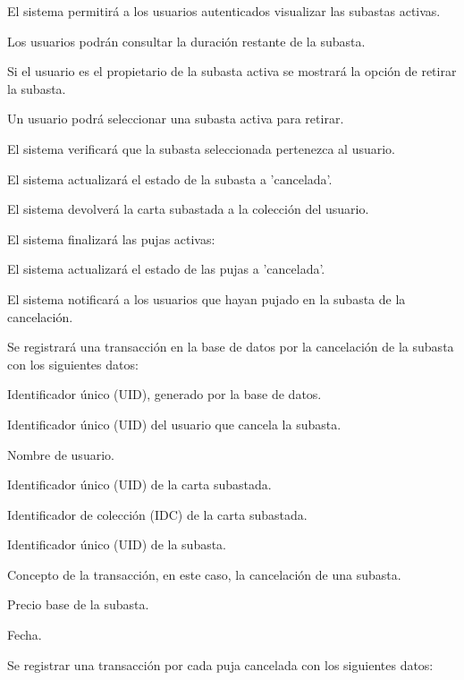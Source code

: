 \begin{RFSubastas}
	\item El sistema permitirá a los usuarios autenticados visualizar las subastas activas.
	\begin{RFSubastas}
		\item Los usuarios podrán consultar la duración restante de la subasta.
		\item Si el usuario es el propietario de la subasta activa se mostrará la opción de retirar la subasta.\hypertarget{req_subastas_pujas:retirarSubasta}{}
		\begin{RFSubastas}   
		\item Un usuario podrá seleccionar una subasta activa para retirar.
		\item El sistema verificará que la subasta seleccionada pertenezca al usuario.
		\item El sistema actualizará el estado de la subasta a 'cancelada'.
		\item El sistema devolverá la carta subastada a la colección del usuario.
		\item El sistema finalizará las pujas activas:
		\begin{RFSubastas}
			\item El sistema actualizará el estado de las pujas a 'cancelada'.
			\item El sistema notificará a los usuarios que hayan pujado en la subasta de la cancelación.
		\end{RFSubastas}
		\item Se registrará una transacción en la base de datos por la cancelación de la subasta con los siguientes datos:
		\begin{RFSubastas}
			\item Identificador único (UID), generado por la base de datos.
			\item Identificador único (UID) del usuario que cancela la subasta.
			\item Nombre de usuario.
			\item Identificador único (UID) de la carta subastada.
			\item Identificador de colección (IDC) de la carta subastada.
			\item Identificador único (UID) de la subasta.
			\item Concepto de la transacción, en este caso, la cancelación de una subasta.
			\item Precio base de la subasta.
			\item Fecha.
		\end{RFSubastas}
		\item Se registrar una transacción por cada puja cancelada con los siguientes datos:

\end{RFSubastas}
\end{RFSubastas}
\end{RFSubastas}
